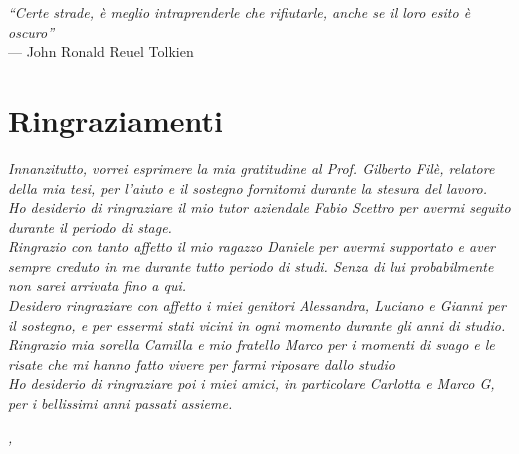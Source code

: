 
\cleardoublepage
{}
{}

\begin{flushright}{
	\slshape    
	``Certe strade, è meglio intraprenderle che rifiutarle, anche se il loro esito è oscuro''} \\ 
	\medskip
    --- John Ronald Reuel Tolkien
\end{flushright}


\bigskip

\begingroup
\let\clearpage\relax
\let\cleardoublepage\relax
\let\cleardoublepage\relax

\chapter*{Ringraziamenti}

\noindent \textit{Innanzitutto, vorrei esprimere la mia gratitudine al Prof. Gilberto Filè, relatore della mia tesi, per l'aiuto e il sostegno fornitomi durante la stesura del lavoro.}\\

\noindent \textit{Ho desiderio di ringraziare il mio tutor aziendale Fabio Scettro per avermi seguito durante il periodo di stage.}\\

\noindent \textit{Ringrazio con tanto affetto il mio ragazzo Daniele per avermi supportato e aver sempre creduto in me durante tutto periodo di studi. Senza di lui probabilmente non sarei arrivata fino a qui.}\\

\noindent \textit{Desidero ringraziare con affetto i miei genitori Alessandra, Luciano e Gianni per il sostegno, e per essermi stati vicini in ogni momento durante gli anni di studio.}\\

\noindent \textit{Ringrazio mia sorella Camilla e mio fratello Marco per i momenti di svago e le risate che mi hanno fatto vivere per farmi riposare dallo studio}\\

\noindent \textit{Ho desiderio di ringraziare poi i miei amici, in particolare Carlotta e Marco G, per i bellissimi anni passati assieme.}\\
\bigskip

\noindent\textit{\myLocation, \myTime}
\hfill \myName

\endgroup


